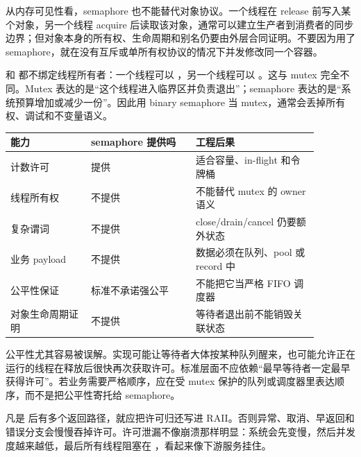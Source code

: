 从内存可见性看，semaphore 也不能替代对象协议。一个线程在 release 前写入某个对象，另一个线程 acquire 后读取该对象，通常可以建立生产者到消费者的同步边界；但对象本身的所有权、生命周期和别名仍要由外层合同证明。不要因为用了 semaphore，就在没有互斥或单所有权协议的情况下并发修改同一个容器。

 和  都不绑定线程所有者：一个线程可以 ，另一个线程可以 。这与 mutex 完全不同。Mutex 表达的是“这个线程进入临界区并负责退出”；semaphore 表达的是“系统预算增加或减少一份”。因此用 binary semaphore 当 mutex，通常会丢掉所有权、调试和不变量语义。

\begin{center}
\small
\begin{tabular}{p{0.23\linewidth}p{0.30\linewidth}p{0.35\linewidth}}
\toprule
能力 & semaphore 提供吗 & 工程后果 \\
\midrule
计数许可 & 提供 & 适合容量、in-flight 和令牌桶 \\
线程所有权 & 不提供 & 不能替代 mutex 的 owner 语义 \\
复杂谓词 & 不提供 & close/drain/cancel 仍要额外状态 \\
业务 payload & 不提供 & 数据必须在队列、pool 或 record 中 \\
公平性保证 & 标准不承诺强公平 & 不能把它当严格 FIFO 调度器 \\
对象生命周期证明 & 不提供 & 等待者退出前不能销毁关联状态 \\
\bottomrule
\end{tabular}
\end{center}

公平性尤其容易被误解。实现可能让等待者大体按某种队列醒来，也可能允许正在运行的线程在释放后很快再次获取许可。标准层面不应依赖“最早等待者一定最早获得许可”。若业务需要严格顺序，应在受 mutex 保护的队列或调度器里表达顺序，而不是把公平性寄托给 semaphore。

凡是  后有多个返回路径，就应把许可归还写进 RAII。否则异常、取消、早返回和错误分支会慢慢吞掉许可。许可泄漏不像崩溃那样明显：系统会先变慢，然后并发度越来越低，最后所有线程阻塞在 ，看起来像下游服务挂住。

